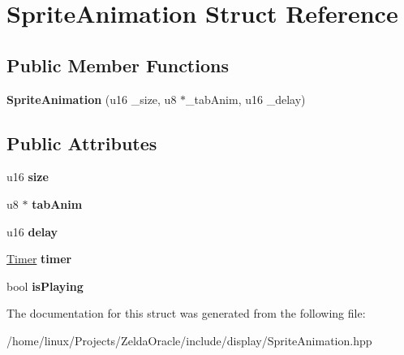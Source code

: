 \hypertarget{structSpriteAnimation}{\section{Sprite\+Animation Struct Reference}
\label{structSpriteAnimation}
}
\subsection*{Public Member Functions}
\begin{DoxyCompactItemize}
\item 
\hypertarget{structSpriteAnimation_a3ba301d059d8f247ea4c96d47a85768a}{{\bfseries Sprite\+Animation} (u16 \+\_\+size, u8 $\ast$\+\_\+tab\+Anim, u16 \+\_\+delay)}\label{structSpriteAnimation_a3ba301d059d8f247ea4c96d47a85768a}

\end{DoxyCompactItemize}
\subsection*{Public Attributes}
\begin{DoxyCompactItemize}
\item 
\hypertarget{structSpriteAnimation_aa547caf0c49262f082865ab9422619ea}{u16 {\bfseries size}}\label{structSpriteAnimation_aa547caf0c49262f082865ab9422619ea}

\item 
\hypertarget{structSpriteAnimation_a25b1c835bb1754c37db207ecfebfd7ce}{u8 $\ast$ {\bfseries tab\+Anim}}\label{structSpriteAnimation_a25b1c835bb1754c37db207ecfebfd7ce}

\item 
\hypertarget{structSpriteAnimation_a8692dae92b2f3f23fb27846fad397f98}{u16 {\bfseries delay}}\label{structSpriteAnimation_a8692dae92b2f3f23fb27846fad397f98}

\item 
\hypertarget{structSpriteAnimation_a7f051b8f289ffd16b226bc2abbd26888}{\hyperlink{classTimer}{Timer} {\bfseries timer}}\label{structSpriteAnimation_a7f051b8f289ffd16b226bc2abbd26888}

\item 
\hypertarget{structSpriteAnimation_a37b4a887ed53f1b808a37dad19083f0e}{bool {\bfseries is\+Playing}}\label{structSpriteAnimation_a37b4a887ed53f1b808a37dad19083f0e}

\end{DoxyCompactItemize}


The documentation for this struct was generated from the following file\+:\begin{DoxyCompactItemize}
\item 
/home/linux/\+Projects/\+Zelda\+Oracle/include/display/Sprite\+Animation.\+hpp\end{DoxyCompactItemize}
